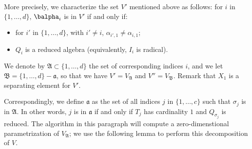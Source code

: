 \documentclass[12pt]{article}
\begin{document}
More precisely, we characterize the set $V'$ mentioned above as follows: for $i$ in
$\{1,\dots,d\}$, $\balpha_i$ is in $V'$ if and only if:
\begin{itemize}
	\item for $i'$ in $\{1,\dots,d\}$, with $i'\ne i$, $\alpha_{i',1} \ne
	\alpha_{i,1}$;
	\item $Q_i$ is a reduced algebra (equivalently, $I_i$ is radical).
\end{itemize}
We denote by $\mathfrak{A}\subset \{1,\dots,d\}$ the set of
corresponding indices $i$, and we let
$\mathfrak{B}=\{1,\dots,d\}-\mathfrak{a}$, so that we have
$V'=V_{\mathfrak{A}}$ and $V''=V_{\mathfrak{B}}$.  Remark that $X_1$
is a separating element for $V'$.

Correspondingly, we define $\mathfrak{a}$ as the set of all indices
$j$ in $\{1,\dots,c\}$ such that $\sigma_j$ is in $\mathfrak{A}$. In
other words, $j$ is in $\mathfrak{a}$ if and only if $T_j$ has
cardinality $1$ and $Q_{\sigma_j}$ is reduced.  The algorithm in this
paragraph will compute a zero-dimenstional parametrization of
$V_{\mathfrak{A}}$; we use the following lemma to perform this
decomposition of $V$.
\end{document}
